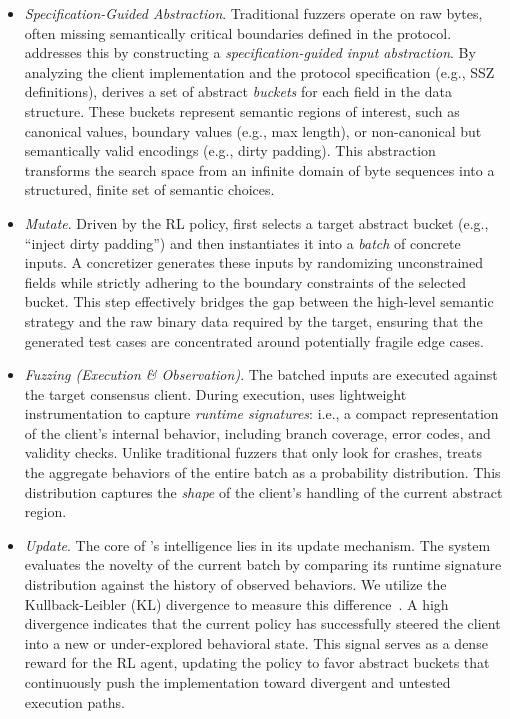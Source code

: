 \begin{itemize}
    \item \emph{Specification-Guided Abstraction}. Traditional fuzzers operate on raw bytes, often missing semantically critical boundaries defined in the protocol. \tool addresses this by constructing a \emph{specification-guided input abstraction}. By analyzing the client implementation and the protocol specification (e.g., SSZ definitions), \tool derives a set of abstract \emph{buckets} for each field in the data structure. These buckets represent semantic regions of interest, such as canonical values, boundary values (e.g., max length), or non-canonical but semantically valid encodings (e.g., dirty padding). This abstraction transforms the search space from an infinite domain of byte sequences into a structured, finite set of semantic choices.

    \item \emph{Mutate}. Driven by the RL policy, \tool first selects a target abstract bucket (e.g., ``inject dirty padding'') and then instantiates it into a \emph{batch} of concrete inputs. A concretizer generates these inputs by randomizing unconstrained fields while strictly adhering to the boundary constraints of the selected bucket. This step effectively bridges the gap between the high-level semantic strategy and the raw binary data required by the target, ensuring that the generated test cases are concentrated around potentially fragile edge cases.

    \item \emph{Fuzzing (Execution \& Observation)}. The batched inputs are executed against the target consensus client. During execution, \tool uses lightweight instrumentation to capture \emph{runtime signatures}: i.e., a compact representation of the client's internal behavior, including branch coverage, error codes, and validity checks. Unlike traditional fuzzers that only look for crashes, \tool treats the aggregate behaviors of the entire batch as a probability distribution. This distribution captures the \emph{shape} of the client's handling of the current abstract region.

    \item \emph{Update}. The core of \tool's intelligence lies in its update mechanism. The system evaluates the novelty of the current batch by comparing its runtime signature distribution against the history of observed behaviors. We utilize the Kullback-Leibler (KL) divergence to measure this difference~\cite{kullback1951information}. A high divergence indicates that the current policy has successfully steered the client into a new or under-explored behavioral state. This signal serves as a dense reward for the RL agent, updating the policy to favor abstract buckets that continuously push the implementation toward divergent and untested execution paths.
\end{itemize}

